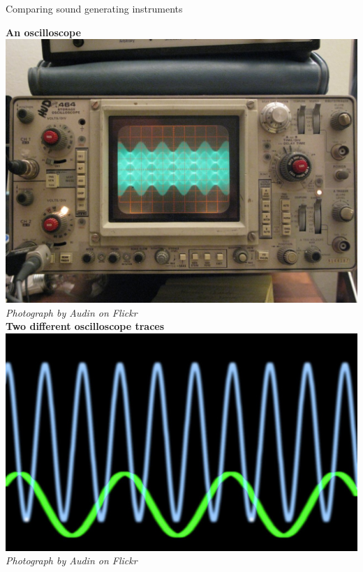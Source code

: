 \begin{activity}{Comparing sound generating instruments}
\begin{minipage}{.5\textwidth}
\end{minipage}
\begin{minipage}{.5\textwidth}
\begin{center}
\textbf{An oscilloscope}\\
\includegraphics[width=.8\textwidth]{photos/oscilloscope_Audin_Flickr.jpg}\\
\textsl{Photograph by Audin on Flickr}\\
\textbf{Two different oscilloscope traces}\\
\includegraphics[width=.8\textwidth]{photos/oscilloscopetrace_Creativity103_Flickr.jpg}\\
\textsl{Photograph by Audin on Flickr}\\
\end{center}
\end{minipage}

\begin{minipage}{.5\textwidth}
 	

\end{minipage}
\end{activity}

